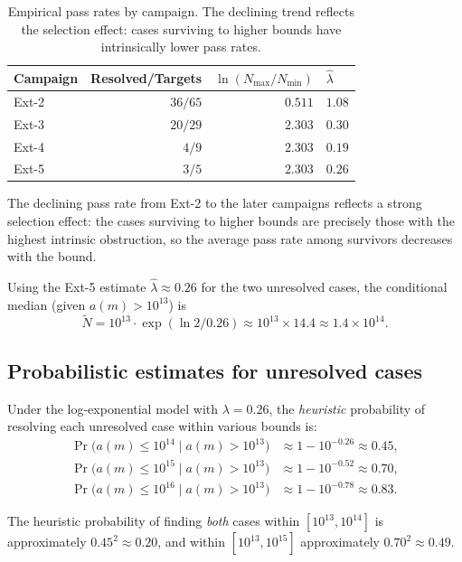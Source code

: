 \documentclass{amsart}
\theoremstyle{definition}
\theoremstyle{remark}
\numberwithin{equation}{section}
\begin{document}
\begin{table}[ht]
\centering
\caption{Empirical pass rates by campaign.  The declining
trend reflects the selection effect: cases surviving to higher
bounds have intrinsically lower pass rates.}
\label{tab:passrate}
\begin{tabular}{lrrl}
\toprule
Campaign & Resolved/Targets & $\ln(N_{\max}/N_{\min})$ &
  $\hat\lambda$ \\
\midrule
Ext-2 & $36/65$  & $0.511$ & $1.08$ \\
Ext-3 & $20/29$  & $2.303$ & $0.30$ \\
Ext-4 & $4/9$    & $2.303$ & $0.19$ \\
Ext-5 & $3/5$    & $2.303$ & $0.26$ \\
\bottomrule
\end{tabular}
\end{table}

The declining pass rate from Ext-2 to the later campaigns
reflects a strong selection effect: the cases surviving to higher
bounds are precisely those with the highest intrinsic obstruction,
so the average pass rate among survivors decreases with the bound.

Using the Ext-5 estimate $\hat\lambda \approx 0.26$ for the
two unresolved cases, the conditional median (given $a(m) > 10^{13}$)
is
\[
\tilde{N} = 10^{13} \cdot \exp(\ln 2 / 0.26)
\approx 10^{13} \times 14.4
\approx 1.4 \times 10^{14}.
\]

\subsection{Probabilistic estimates for unresolved cases}

Under the log-exponential model with $\lambda = 0.26$,
the \emph{heuristic} probability of resolving each unresolved case
within various bounds is:
\begin{align*}
\Pr\bigl(a(m) \le 10^{14} \mid a(m) > 10^{13}\bigr)
  &\approx 1 - 10^{-0.26} \approx 0.45, \\
\Pr\bigl(a(m) \le 10^{15} \mid a(m) > 10^{13}\bigr)
  &\approx 1 - 10^{-0.52} \approx 0.70, \\
\Pr\bigl(a(m) \le 10^{16} \mid a(m) > 10^{13}\bigr)
  &\approx 1 - 10^{-0.78} \approx 0.83.
\end{align*}

The heuristic probability of finding \emph{both} cases within
$[10^{13}, 10^{14}]$ is approximately $0.45^2 \approx 0.20$,
and within $[10^{13}, 10^{15}]$ approximately
$0.70^2 \approx 0.49$.
\end{document}
